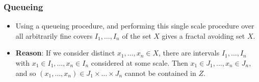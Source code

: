 \documentclass[handout,usenames,dvipsnames]{beamer}
\begin{document}
\begin{frame}
    \frametitle{Queueing}

    \begin{itemize}
        \item Using a queueing procedure, and performing this single scale procedure over all arbitrarily fine covers $I_1, \dots, I_n$ of the set $X$ gives a fractal avoiding set $X$.

        \pause
        \item {\bf Reason}: If we consider distinct $x_1, \dots, x_n \in X$, there are intervals $I_1, \dots, I_n$ with $x_1 \in I_1, \dots, x_n \in I_n$ considered at some scale. Then $x_1 \in J_1, \dots, x_n \in J_n$, and so $(x_1, \dots, x_n) \in J_1 \times \dots \times J_n$ cannot be contained in $Z$.
    \end{itemize}
\end{frame}
\end{document}
